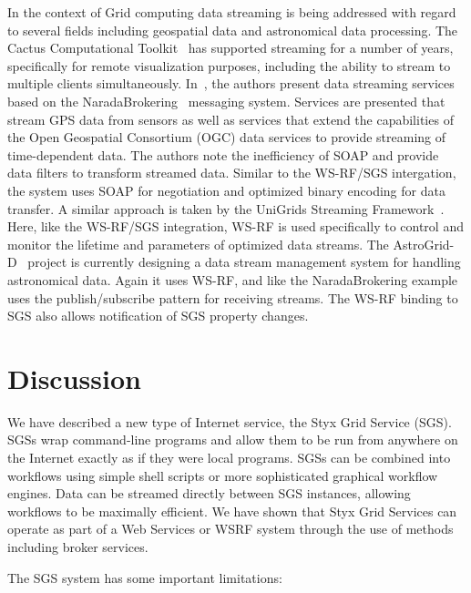 \documentclass[a4paper]{article}
\begin{document}
In the context of Grid computing data streaming is being addressed with regard to several fields including geospatial data and astronomical data processing. The Cactus Computational Toolkit~\cite{allen:2001} has supported streaming for a number of years, specifically for remote visualization purposes, including the ability to stream to multiple clients simultaneously. In~\cite{fox:2006}, the authors present data streaming services based on the NaradaBrokering~\cite{naradabrokering} messaging system. Services are presented that stream GPS data from sensors as well as services that extend the capabilities of the Open Geospatial Consortium (OGC) data services to provide streaming of time-dependent data. The authors note the inefficiency of SOAP and provide data filters to transform streamed data. Similar to the WS-RF/SGS intergation, the system uses SOAP for negotiation and optimized binary encoding for data transfer. A similar approach is taken by the UniGrids Streaming Framework~\cite{benedyczak:2006}. Here, like the WS-RF/SGS integration, WS-RF is used specifically to control and monitor the lifetime and parameters of optimized data streams. The AstroGrid-D~\cite{astrogrid-d} project is currently designing a data stream management system for handling astronomical data. Again it uses WS-RF, and like the NaradaBrokering example uses the publish/subscribe pattern for receiving streams. The WS-RF binding to SGS also allows notification of SGS property changes.

\section{Discussion}

We have described a new type of Internet service, the Styx Grid Service (SGS).  SGSs wrap command-line programs and allow them to be run from anywhere on the Internet exactly as if they were local programs.  SGSs can be combined into workflows using simple shell scripts or more sophisticated graphical workflow engines.  Data can be streamed directly between SGS instances, allowing workflows to be maximally efficient.  We have shown that Styx Grid Services can operate as part of a Web Services or WSRF system through the use of methods including broker services.

The SGS system has some important limitations:
\end{document}
